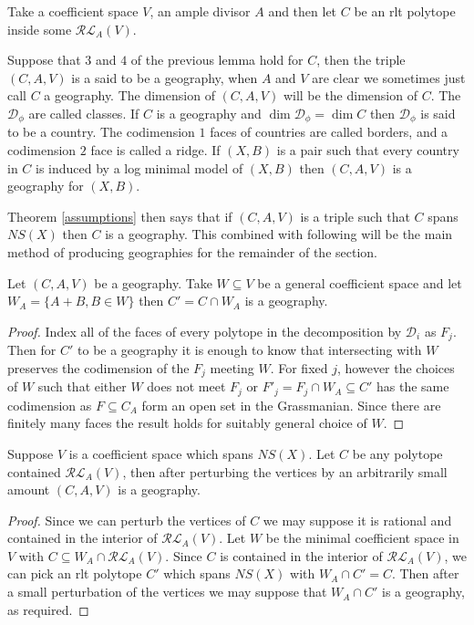 \documentclass[a4paper,12pt]{amsart}
\begin{document}
	\begin{definition}
		Take a coefficient space $V$, an ample divisor $A$ and then let $C$ be an rlt polytope inside some $\mathcal{RL}_{A}(V)$.
		
		Suppose that $3$ and $4$ of the previous lemma hold for $C$, then the triple $(C,A,V)$ is a said to be a geography, when $A$ and $V$ are clear we sometimes just call $C$ a geography. The dimension of $(C,A,V)$ will be the dimension of $C$.
		The $\mathcal{D}_{\phi}$ are called classes.
		If $C$ is a geography and $\dim \mathcal{D_{\phi}}= \dim C$ then $\mathcal{D}_{\phi}$ is said to be a country. The codimension $1$ faces of countries are called borders, and a codimension $2$ face is called a ridge.
		If $(X,B)$ is a pair such that every country in $C$ is induced by a log minimal model of $(X,B)$ then $(C,A,V)$ is a geography for $(X,B)$.
	\end{definition}

	Theorem \ref{assumptions} then says that if $(C,A,V)$ is a triple such that $C$ spans $NS(X)$ then $C$ is a geography.
	This combined with following will be the main method of producing geographies for the remainder of the section.
	
	\begin{lemma}
		Let $(C,A,V)$ be a geography. Take $W \subseteq V$ be a general coefficient space and let $W_{A}=\{A+B, B \in W\}$ then $C'=C \cap W_{A}$ is a geography. 
	\end{lemma}
	\begin{proof}
		Index all of the faces of every polytope in the decomposition by $\mathcal{D}_{i}$ as $F_{j}$. Then for $C'$ to be a geography it is enough to know that intersecting with $W$ preserves the codimension of the $F_{j}$ meeting $W$. For fixed $j$, however the choices of $W$ such that either $W$ does not meet $F_{j}$ or $F'_{j}=F_{j} \cap W_{A} \subseteq C'$ has the same codimension as $F \subseteq C_{A}$ form an open set in the Grassmanian. Since there are finitely many faces the result holds for suitably general choice of $W$.
	\end{proof}

	

	\begin{lemma}
		Suppose $V$ is a coefficient space which spans $NS(X)$. Let $C$ be any polytope contained $\mathcal{RL}_{A}(V)$, then after perturbing the vertices by an arbitrarily small amount $(C,A,V)$ is a geography.
	\end{lemma}
	\begin{proof}
		Since we can perturb the vertices of $C$ we may suppose it is rational and contained in the interior of $\mathcal{RL}_{A}(V)$. Let $W$ be the minimal coefficient space in $V$ with $C \subseteq W_{A}\cap \mathcal{RL}_{A}(V)$. Since $C$ is contained in the interior of $\mathcal{RL}_{A}(V)$, we can pick an rlt polytope $C'$ which spans $NS(X)$ with $W_{A}\cap C'=C$. Then after a small perturbation of the vertices we may suppose that $W_{A}\cap C'$ is a geography, as required.
	\end{proof}
\end{document}
